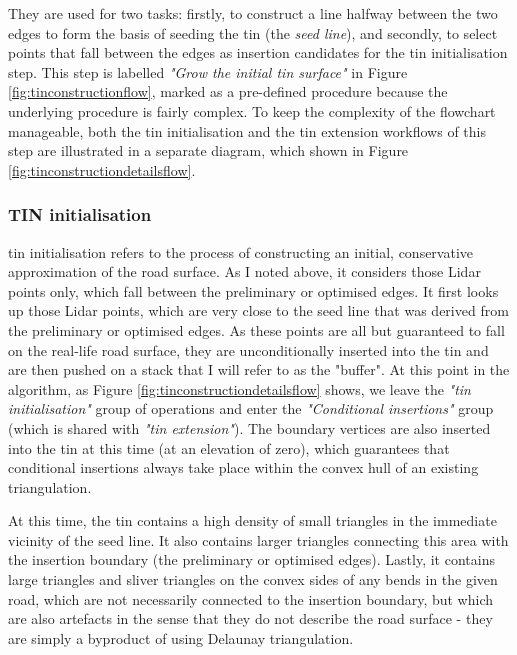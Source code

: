 They are used for two tasks: firstly, to construct a line halfway between the two edges to form the basis of seeding the \ac{tin} (the \textit{seed line}), and secondly, to select points that fall between the edges as insertion candidates for the \ac{tin} initialisation step. This step is labelled \textit{"Grow the initial \ac{tin} surface"} in Figure \ref{fig:tinconstructionflow}, marked as a pre-defined procedure because the underlying procedure is fairly complex. To keep the complexity of the flowchart manageable, both the \ac{tin} initialisation and the \ac{tin} extension workflows of this step are illustrated in a separate diagram, which shown in Figure \ref{fig:tinconstructiondetailsflow}.

\subsubsection{TIN initialisation}

\ac{tin} initialisation refers to the process of constructing an initial, conservative approximation of the road surface. As I noted above, it considers those Lidar points only, which fall between the preliminary or optimised edges. It first looks up those Lidar points, which are very close to the seed line that was derived from the preliminary or optimised edges. As these points are all but guaranteed to fall on the real-life road surface, they are unconditionally inserted into the \ac{tin} and are then pushed on a stack that I will refer to as the "buffer". At this point in the algorithm, as Figure \ref{fig:tinconstructiondetailsflow} shows, we leave the \textit{"\ac{tin} initialisation"} group of operations and enter the \textit{"Conditional insertions"} group (which is shared with \textit{"\ac{tin} extension"}). The boundary vertices are also inserted into the \ac{tin} at this time (at an elevation of zero), which guarantees that conditional insertions always take place within the convex hull of an existing triangulation.

At this time, the \ac{tin} contains a high density of small triangles in the immediate vicinity of the seed line. It also contains larger triangles connecting this area with the insertion boundary (the preliminary or optimised edges). Lastly, it contains large triangles and sliver triangles on the convex sides of any bends in the given road, which are not necessarily connected to the insertion boundary, but which are also artefacts in the sense that they do not describe the road surface - they are simply a byproduct of using Delaunay triangulation.

